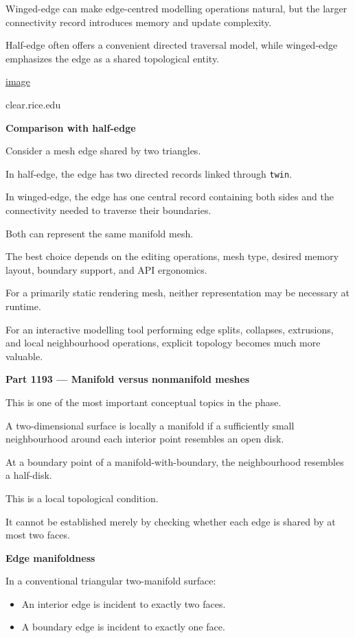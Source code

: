 Winged-edge can make edge-centred modelling operations natural, but the larger connectivity record introduces memory and update complexity.

Half-edge often offers a convenient directed traversal model, while winged-edge emphasizes the edge as a shared topological entity. 

\href{https://www.google.com/s2/favicons?domain=https://www.clear.rice.edu&sz=32}{image}

clear.rice.edu

\textbf{Comparison with half-edge}

Consider a mesh edge shared by two triangles.

In half-edge, the edge has two directed records linked through \texttt{twin}.

In winged-edge, the edge has one central record containing both sides and the connectivity needed to traverse their boundaries.

Both can represent the same manifold mesh.

The best choice depends on the editing operations, mesh type, desired memory layout, boundary support, and API ergonomics.

For a primarily static rendering mesh, neither representation may be necessary at runtime.

For an interactive modelling tool performing edge splits, collapses, extrusions, and local neighbourhood operations, explicit topology becomes much more valuable.

\textbf{Part 1193 --- Manifold versus nonmanifold meshes}

This is one of the most important conceptual topics in the phase.

A two-dimensional surface is locally a manifold if a sufficiently small neighbourhood around each interior point resembles an open disk.

At a boundary point of a manifold-with-boundary, the neighbourhood resembles a half-disk.

This is a local topological condition.

It cannot be established merely by checking whether each edge is shared by at most two faces.

\textbf{Edge manifoldness}

In a conventional triangular two-manifold surface:

\begin{itemize}
\tightlist
\item
  An interior edge is incident to exactly two faces.
\item
  A boundary edge is incident to exactly one face.
\end{itemize}

